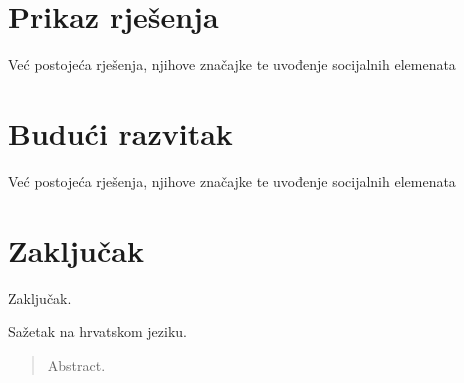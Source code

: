 \documentclass[times, utf8, zavrsni]{fer}
\begin{document}
	\chapter{Prikaz rješenja}
	Već postojeća rješenja, njihove značajke te uvođenje socijalnih elemenata
	
	\chapter{Budući razvitak}
	Već postojeća rješenja, njihove značajke te uvođenje socijalnih elemenata
	
	\chapter{Zaključak}
	Zaključak.
	
	\nocite{react2021}
	\nocite{react-router2021}
	\nocite{bootstrap2021}
	\nocite{materialUI2021}
	\nocite{ace2021}
	\nocite{spring2021}
	\nocite{hibernate2021}
	\nocite{springsecurity2021}
	\nocite{springdatajpa2021}
	\nocite{axios2021}
	\nocite{git2021}
	\nocite{postgresql2021}
	
	
	
	\begin{sazetak}
		Sažetak na hrvatskom jeziku.
		
	\end{sazetak}
	
	\begin{abstract}
		Abstract.
		
	\end{abstract}
	
\end{document}
